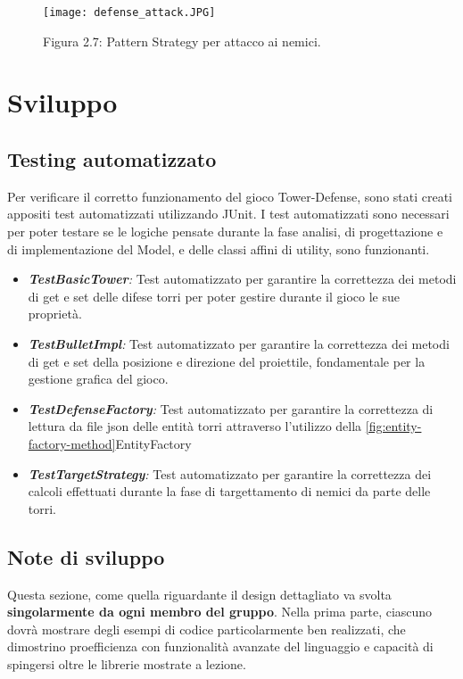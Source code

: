 \documentclass[a4paper,12pt]{report}
\begin{document}
\begin{figure}[H]
    \centering
    \texttt{[image: defense\_attack.JPG]}
    \caption{Figura 2.7: Pattern Strategy per attacco ai nemici.}
    \label{fig:defense_attack}
\end{figure}

\chapter{Sviluppo}
\section{Testing automatizzato}
Per verificare il corretto funzionamento del gioco Tower-Defense, sono stati creati appositi test automatizzati utilizzando JUnit. 
I test automatizzati sono necessari per poter testare se le logiche pensate durante la fase analisi, di progettazione e di implementazione del Model, e delle classi affini di utility, sono funzionanti.


\begin{itemize}
    \item \textit{\textbf{TestBasicTower}:} Test automatizzato per garantire la correttezza dei metodi di get e set delle difese torri per poter gestire durante il gioco le sue proprietà.
    \item \textit{\textbf{TestBulletImpl}:} Test automatizzato per garantire la correttezza dei metodi di get e set della posizione e direzione del proiettile, fondamentale per la gestione grafica del gioco.
    \item \textit{\textbf{TestDefenseFactory}:} Test automatizzato per garantire la correttezza di lettura da file json delle entità torri attraverso l'utilizzo della \ref{fig:entity-factory-method}EntityFactory
    \item \textit{\textbf{TestTargetStrategy}:} Test automatizzato per garantire la correttezza dei calcoli effettuati durante la fase di targettamento di nemici da parte delle torri.
\end{itemize}

\section{Note di sviluppo}

Questa sezione, come quella riguardante il design dettagliato va svolta \textbf{singolarmente da ogni membro del gruppo}.
%
Nella prima parte, ciascuno dovrà mostrare degli esempi di codice particolarmente ben realizzati,
che dimostrino proefficienza con funzionalità avanzate del linguaggio e capacità di spingersi oltre le librerie mostrate a lezione.
\end{document}

